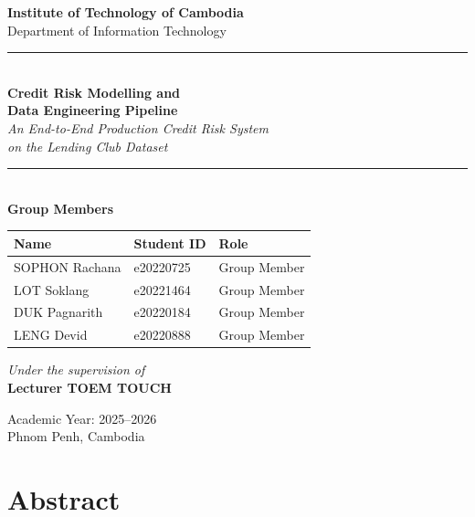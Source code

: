 \documentclass[12pt,a4paper]{report}
\begin{document}
\begin{titlepage}
\centering

\vspace*{1.5cm}

{\LARGE\bfseries Institute of Technology of Cambodia}\\[0.5cm]
{\large Department of Information Technology}\\[2cm]

\rule{\textwidth}{1.5pt}\\[0.4cm]
{\Huge\bfseries Credit Risk Modelling and\\[0.3cm] Data Engineering Pipeline}\\[0.3cm]
{\Large\itshape An End-to-End Production Credit Risk System\\
on the Lending Club Dataset}\\[0.3cm]
\rule{\textwidth}{1.5pt}\\[2cm]

{\large\bfseries Group Members}\\[0.5cm]

\begin{tabular}{lll}
\toprule
\textbf{Name} & \textbf{Student ID} & \textbf{Role} \\
\midrule
SOPHON Rachana  & e20220725 & Group Member \\
LOT Soklang     & e20221464 & Group Member \\
DUK Pagnarith   & e20220184 & Group Member \\
LENG Devid      & e20220888 & Group Member \\
\bottomrule
\end{tabular}

\vspace{2cm}

{\large\itshape Under the supervision of}\\[0.4cm]
{\Large\bfseries Lecturer TOEM TOUCH}

\vfill

{\large Academic Year: 2025--2026}\\[0.3cm]
{\large Phnom Penh, Cambodia}

\end{titlepage}

\chapter*{Abstract}
\end{document}
